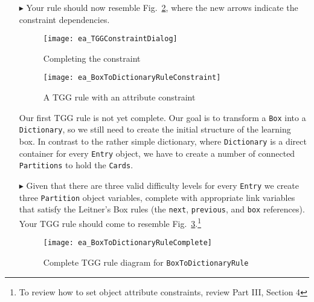 \begin{enumerate}
\item[$\blacktriangleright$] Your rule should now resemble Fig.~\ref{ea:tgg_rule_with_constraint}, where the new arrows indicate the constraint dependencies.

\newpage

\begin{figure}[htbp]
\begin{center}
  \texttt{[image: ea\_TGGConstraintDialog]}
  \caption{Completing the constraint}
  \label{ea:first_tgg_constraint}
\end{center}
\end{figure}

\vspace{1cm}

\begin{figure}[h!]
\begin{center}
  \texttt{[image: ea\_BoxToDictionaryRuleConstraint]}
  \caption{A TGG rule with an attribute constraint}
  \label{ea:tgg_rule_with_constraint}
  \end{center}
\end{figure}

\newpage

Our first TGG rule is not yet complete. Our goal is to transform a \texttt{Box} into a \texttt{Dictionary}, so we still need to create the initial
structure of the learning box. In contrast to the rather simple dictionary, where \texttt{Dictionary} is a direct container for every \texttt{Entry} object, we
have to create a number of connected \texttt{Partitions} to hold the \texttt{Cards}.

\vspace{0.5cm}

\item[$\blacktriangleright$] Given that there are three valid difficulty levels for every \texttt{Entry} we create three \texttt{Partition} object variables,
complete with appropriate link variables that satisfy the Leitner's Box rules (the \texttt{next}, \texttt{previous}, and \texttt{box} references). Your TGG rule
should come to resemble Fig.~\ref{ea:boxtodictionaryrule_complete}.\footnote{To review how to set object attribute constraints, review Part III, Section 4}

\vspace{0.5cm}

\begin{figure}[htbp]
\begin{center}
  \texttt{[image: ea\_BoxToDictionaryRuleComplete]}
  \caption{Complete TGG rule diagram for \texttt{BoxToDictionaryRule}}
  \label{ea:boxtodictionaryrule_complete}
  \end{center}
\end{figure}

\end{enumerate}

